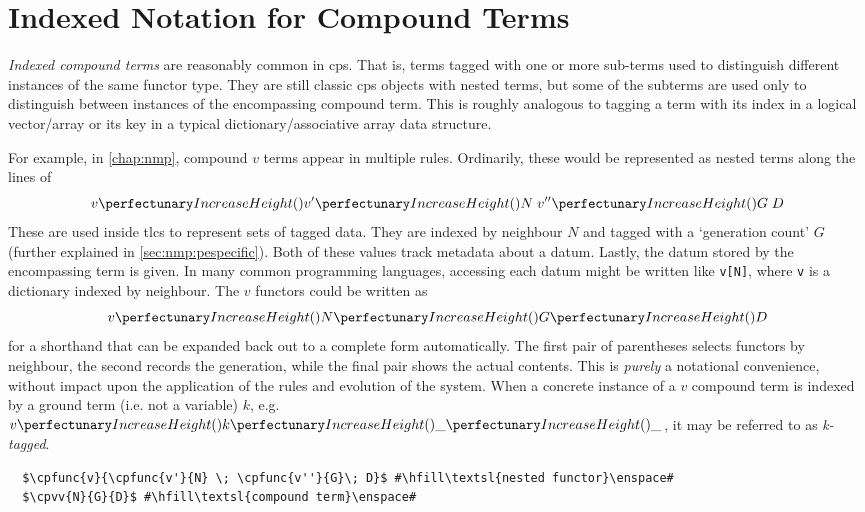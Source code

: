 \section{\label{sec:cps:compoundterms}Indexed Notation for Compound Terms}

\emph{Indexed compound terms} are reasonably common in \gls{cps}.  That is, terms tagged with one or more sub-terms used to distinguish different instances of the same \gls{functor} type.  They are still classic \gls{cps} objects with nested terms, but some of the subterms are used only to distinguish between instances of the encompassing compound term.  This is roughly analogous to tagging a term with its index in a logical vector/array or its key in a typical dictionary/associative array data structure.

For example, in \cref{chap:nmp}, compound \(v\) terms appear in multiple rules.  Ordinarily, these would be represented as nested terms along the lines of
\[ \cpfunc{v}{\cpfunc{v'}{N} \; \cpfunc{v''}{G}\; D} \]
These are used inside \glspl{tlc} to represent sets of tagged data.  They are indexed by neighbour \(N\) and tagged with a `generation count' \(G\) (further explained in \cref{sec:nmp:pespecific}).  Both of these values track metadata about a datum.  Lastly, the datum stored by the encompassing term is given.  In many common programming languages, accessing each datum might be written like \texttt{v[N]}, where \texttt{v} is a dictionary indexed by neighbour.  The \(v\) \glspl{functor} could be written as \[ \cpvv{N}{G}{D} \] for a shorthand that can be expanded back out to a complete form automatically.  The first pair of parentheses selects \glspl{functor} by neighbour, the second records the generation, while the final pair shows the actual contents.  This is \emph{purely} a notational convenience, without impact upon the application of the rules and evolution of the system.  When a concrete instance of a \(v\) compound term is indexed by a ground term (i.e. not a variable) \(k\), e.g. \(\cpvv{k}{\_}{\_}\), it may be referred to as \emph{k-tagged}.

\lstset{xleftmargin=.5in, xrightmargin=.5in} 
\begin{lstlisting}
  $\cpfunc{v}{\cpfunc{v'}{N} \; \cpfunc{v''}{G}\; D}$ #\hfill\textsl{nested functor}\enspace#
  $\cpvv{N}{G}{D}$ #\hfill\textsl{compound term}\enspace#
\end{lstlisting}